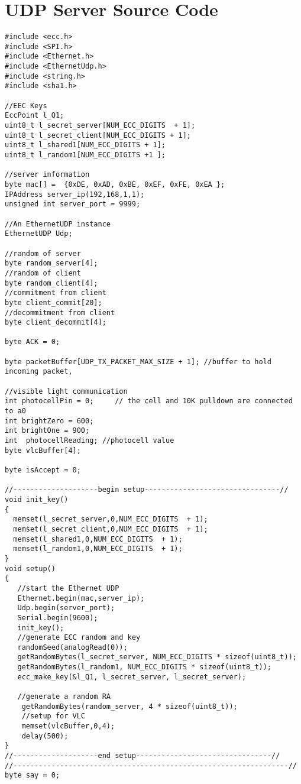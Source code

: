 \section{UDP Server Source Code}
{\small 
\begin{Verbatim}[fontsize=\small]
#include <ecc.h>
#include <SPI.h>
#include <Ethernet.h>
#include <EthernetUdp.h>
#include <string.h>
#include <sha1.h>

//EEC Keys
EccPoint l_Q1;
uint8_t l_secret_server[NUM_ECC_DIGITS  + 1];
uint8_t l_secret_client[NUM_ECC_DIGITS + 1];
uint8_t l_shared1[NUM_ECC_DIGITS + 1];
uint8_t l_random1[NUM_ECC_DIGITS +1 ];

//server information
byte mac[] =  {0xDE, 0xAD, 0xBE, 0xEF, 0xFE, 0xEA };
IPAddress server_ip(192,168,1,1);
unsigned int server_port = 9999;

//An EthernetUDP instance
EthernetUDP Udp;

//random of server
byte random_server[4];
//random of client
byte random_client[4];
//commitment from client
byte client_commit[20];
//decommitment from client
byte client_decommit[4];

byte ACK = 0;

byte packetBuffer[UDP_TX_PACKET_MAX_SIZE + 1]; //buffer to hold incoming packet,

//visible light communication 
int photocellPin = 0;     // the cell and 10K pulldown are connected to a0
int brightZero = 600;
int brightOne = 900;
int  photocellReading; //photocell value
byte vlcBuffer[4];

byte isAccept = 0;

//--------------------begin setup--------------------------------//
void init_key()
{
  memset(l_secret_server,0,NUM_ECC_DIGITS  + 1);
  memset(l_secret_client,0,NUM_ECC_DIGITS  + 1);
  memset(l_shared1,0,NUM_ECC_DIGITS  + 1);
  memset(l_random1,0,NUM_ECC_DIGITS  + 1);
}
void setup()
{
   //start the Ethernet UDP
   Ethernet.begin(mac,server_ip);
   Udp.begin(server_port);
   Serial.begin(9600);
   init_key();
   //generate ECC random and key
   randomSeed(analogRead(0));
   getRandomBytes(l_secret_server, NUM_ECC_DIGITS * sizeof(uint8_t));
   getRandomBytes(l_random1, NUM_ECC_DIGITS * sizeof(uint8_t));
   ecc_make_key(&l_Q1, l_secret_server, l_secret_server);
   
   //generate a random RA
    getRandomBytes(random_server, 4 * sizeof(uint8_t));
    //setup for VLC
    memset(vlcBuffer,0,4);
    delay(500);
}
//--------------------end setup--------------------------------//
//-----------------------------------------------------------------//
byte say = 0;


\end{Verbatim}}
